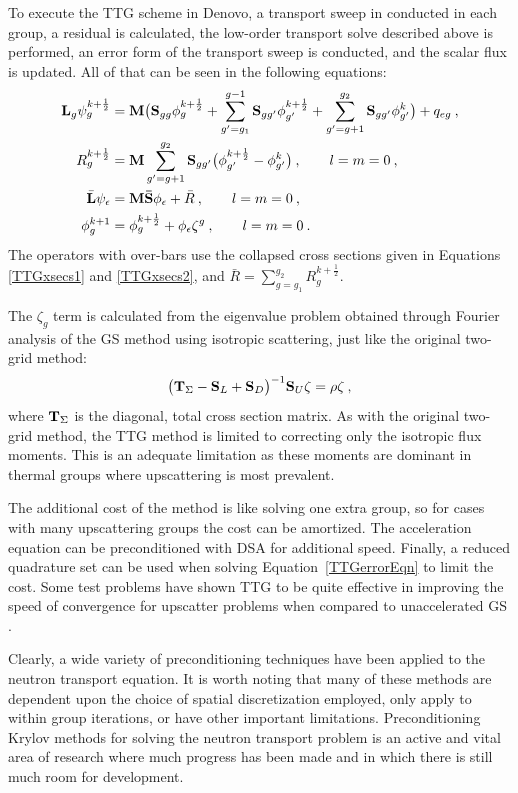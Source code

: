 To execute the TTG scheme in Denovo, a transport sweep in conducted in each group, a residual is calculated, the low-order transport solve described above is performed, an error form of the transport sweep is conducted, and the scalar flux is updated. All of that can be seen in the following equations: 
\begin{align}
  \mathbf{L}_g \psi_g^{k+\frac{1}{2}} &= \mathbf{M}\bigl(\mathbf{S}_{gg}\phi_g^{k+\frac{1}{2}} + \sum_{g'=g_1}^{g-1} \mathbf{S}_{gg'}\phi_{g'}^{k+\frac{1}{2}} + \sum_{g'=g+1}^{g_2}\mathbf{S}_{gg'}\phi_{g'}^k \bigr) + q_{eg}  \:, \\
  R^{k+\frac{1}{2}}_g &= \mathbf{M} \sum_{g'=g+1}^{g_2}\mathbf{S}_{gg'} \bigl( \phi_{g'}^{k+\frac{1}{2}} - \phi_{g'}^k \bigr) \:, \qquad l = m = 0 \:, \\
  \bar{\mathbf{L}}\psi_{\epsilon} &= \mathbf{M\bar{S}} \phi_{\epsilon} + \bar{R} \:, \qquad l = m = 0 \:, \label{TTGerrorEqn} \\
  \phi_g^{k+1} &= \phi_{g}^{k+\frac{1}{2}} + \phi_{\epsilon}\zeta^g \:, \qquad l = m = 0 \:.
\end{align}
The operators with over-bars use the collapsed cross sections given in Equations \eqref{TTGxsecs1} and \eqref{TTGxsecs2}, and $\bar{R} = \sum_{g=g_1}^{g_2} R_g^{k+\frac{1}{2}}$. 

The $\zeta_g$ term is calculated from the eigenvalue problem obtained through Fourier analysis of the GS method using isotropic scattering, just like the original two-grid method:
%
\begin{equation}
  \bigl(\mathbf{T}_{\Sigma} - \mathbf{S}_L + \mathbf{S}_D\bigr)^{-1} \mathbf{S}_U\zeta = \rho\zeta \:,
\end{equation}
where $\mathbf{T}_{\Sigma}$ is the diagonal, total cross section matrix. As with the original two-grid method, the TTG method is limited to correcting only the isotropic flux moments. This is an adequate limitation as these moments are dominant in thermal groups where upscattering is most prevalent\cite{Evans2009d}.   

The additional cost of the method is like solving one extra group, so for cases with many upscattering groups the cost can be amortized. The acceleration equation can be preconditioned with DSA for additional speed. Finally, a reduced quadrature set can be used when solving Equation~\eqref{TTGerrorEqn} to limit the cost. Some test problems have shown TTG to be quite effective in improving the speed of convergence for upscatter problems when compared to unaccelerated GS \cite{Evans2009d}.

Clearly, a wide variety of preconditioning techniques have been applied to the neutron transport equation. It is worth noting that many of these methods are dependent upon the choice of spatial discretization employed, only apply to within group iterations, or have other important limitations. Preconditioning Krylov methods for solving the neutron transport problem is an active and vital area of research where much progress has been made and in which there is still much room for development. 

